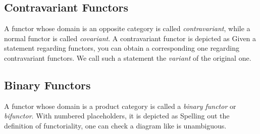 \subsection{Contravariant Functors}

A functor whose domain is an opposite category
is called \emph{contravariant}, while a normal functor is called \emph{covariant}.
A contravariant functor is depicted as
Given a statement regarding functors, you can obtain a corresponding one regarding contravariant functors. %
We call such a statement the \emph{variant} of the original one.


\subsection{Binary Functors}

A functor whose domain is a product category
is called a \emph{binary functor} or \emph{bifunctor}. With numbered placeholders, it is depicted as
Spelling out the definition of functoriality, one can check a diagram like
is unambiguous.


